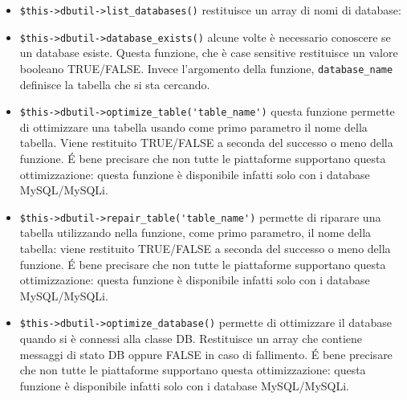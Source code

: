 \begin{itemize}
\item \verb|$this->dbutil->list_databases()| restituisce un array di nomi di database:


\item \verb|$this->dbutil->database_exists()| alcune volte è necessario conoscere se un database esiste. Questa funzione, che è case sensitive restituisce un valore booleano TRUE/FALSE. Invece l'argomento della funzione, \verb|database_name| definisce la tabella che si sta cercando.


\item \verb|$this->dbutil->optimize_table('table_name')| questa funzione permette di ottimizzare una tabella usando come primo parametro il nome della tabella. Viene restituito TRUE/FALSE a seconda del successo o meno della funzione. \'E bene precisare che non tutte le piattaforme supportano questa ottimizzazione: questa funzione è disponibile infatti solo con i database MySQL/MySQLi.


\item \verb|$this->dbutil->repair_table('table_name')| permette di riparare una tabella utilizzando nella funzione, come primo parametro, il nome della tabella: viene restituito TRUE/FALSE a seconda del successo o meno della funzione. \'E bene precisare che non tutte le piattaforme supportano questa ottimizzazione: questa funzione è disponibile infatti solo con i database MySQL/MySQLi.


\item \verb|$this->dbutil->optimize_database()| permette di ottimizzare il database quando si è connessi alla classe DB. Restituisce un array che contiene messaggi di stato DB oppure FALSE in caso di fallimento. \'E bene precisare che non tutte le piattaforme supportano questa ottimizzazione: questa funzione è disponibile infatti solo con i database MySQL/MySQLi.


\end{itemize}
